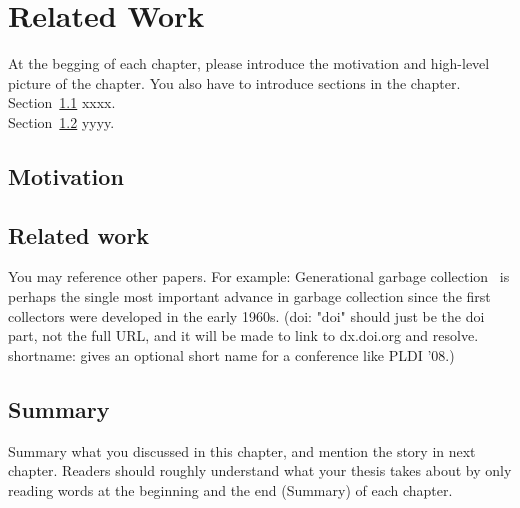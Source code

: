 \chapter{Related Work}
\label{cha:background}
At the begging of each chapter, please introduce the motivation and high-level
picture of the chapter. You also have to introduce sections in the
chapter. \\


Section~\ref{sec:motivation} xxxx.\\


Section~\ref{sec:relatedwork} yyyy.\\


\section{Motivation}
\label{sec:motivation}


\section{Related work}
\label{sec:relatedwork}
You may reference other papers. For example: 
Generational garbage collection~\citep{LH:83,Moon:84,Ungar:84} is perhaps the
single most important advance in garbage collection since the first collectors
were developed in the early 1960s. (doi: "doi" should just be the doi part, not
the full URL, and it will be made to link to dx.doi.org and resolve.
shortname: gives an optional short name for a conference like PLDI '08.)





\section{Summary}
Summary what you discussed in this chapter, and mention the story in next
chapter. Readers should roughly understand what your thesis takes about by only reading
words at the beginning and the end (Summary) of each chapter.



